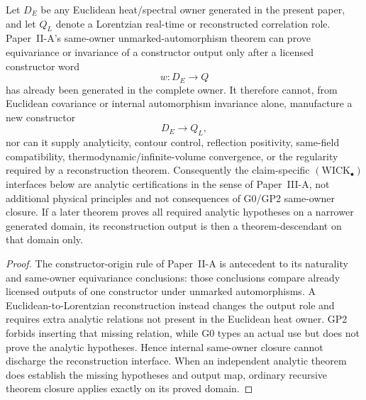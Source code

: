 \documentclass[12pt,a4paper]{article}
\begin{document}
\begin{proposition}
\label{p3e:prop:v169-analytic-reconstruction-firewall}
Let \(D_E\) be any Euclidean heat/spectral owner generated in the present
paper, and let \(Q_L\) denote a Lorentzian real-time or reconstructed
correlation role.  Paper~II-A's same-owner unmarked-automorphism theorem can
prove equivariance or invariance of a constructor output only after a licensed
constructor word
\[
   w:D_E\longrightarrow Q
\]
has already been generated in the complete owner.  It therefore cannot, from
Euclidean covariance or internal automorphism invariance alone, manufacture a
new constructor
\[
   D_E\longrightarrow Q_L,
\]
nor can it supply analyticity, contour control, reflection positivity,
same-field compatibility, thermodynamic/infinite-volume convergence, or the
regularity required by a reconstruction theorem.  Consequently the
claim-specific \((\mathrm{WICK}_\bullet)\) interfaces below are analytic
certifications in the sense of Paper~III-A, not additional physical principles
and not consequences of G0/GP2 same-owner closure.  If a later theorem proves
all required analytic hypotheses on a narrower generated domain, its
reconstruction output is then a theorem-descendant on that domain only.
\end{proposition}

\begin{proof}
The constructor-origin rule of Paper~II-A is antecedent to its naturality and
same-owner equivariance conclusions: those conclusions compare already
licensed outputs of one constructor under unmarked automorphisms.  A
Euclidean-to-Lorentzian reconstruction instead changes the output role and
requires extra analytic relations not present in the Euclidean heat owner.
GP2 forbids inserting that missing relation, while G0 types an actual use but
does not prove the analytic hypotheses.  Hence internal same-owner closure
cannot discharge the reconstruction interface.  When an independent analytic
theorem does establish the missing hypotheses and output map, ordinary
recursive theorem closure applies exactly on its proved domain.
\end{proof}
\end{document}
